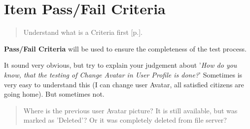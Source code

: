 \section{Item Pass/Fail Criteria}
\label{sec:Item Pass/Fail Criteria}

\begin{quote}
Understand what is a Criteria first [p.\pageref{sec:Criteria}].
\end{quote} 

\textbf{Pass/Fail Criteria} will be used to ensure the completeness of the test process.

It sound very obvious, but try to explain your judgement about '\textit{How do you know, that the testing of Change Avatar in User Profile is done?}' Sometimes is very easy to understand this (I can change user Avatar, all satisfied citizens are going home). But sometimes not.

\begin{quote}
Where is the previous user Avatar picture? It is still available, but was marked as 'Deleted'? Or it was completely deleted from file server?
\end{quote} 